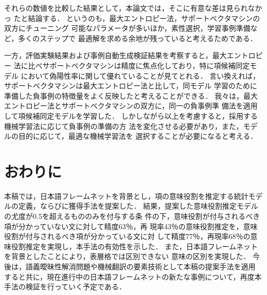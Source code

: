 \documentclass[japanese]{jnlp_1.2b}
\begin{document}
それらの数値を比較した結果として，本論文では，そこに有意な差は見られなかっ
たと結論する．
というのも，最大エントロピー法，サポートベクタマシンの双方にチューニング
可能なパラメータが多いほか，素性選択，学習事例準備など，多くのステップで
最適解を求める余地が残っていると考えるためである．

一方，評価実験結果および事例自動生成検証結果を考察すると，最大エントロピー
法に比べサポートベクタマシンは精度に焦点化しており，特に項候補同定モデル
において偽陽性率に関して優れていることが見てとれる．
言い換えれば，サポートベクタマシンは最大エントロピー法と比して，同モデル
学習のために準備した負事例の特徴量をよく反映したと考えることができる．
我々は，最大エントロピー法とサポートベクタマシンの双方に，同一の負事例準
備法を適用して項候補同定モデルを学習した．
しかしながら以上を考慮すると，採用する機械学習法に応じて負事例の準備の方
法を変化させる必要があり，また，モデルの目的に応じて，最適な機械学習法を
選択することが必要になると考える．



\section{おわりに}\label{sec:conc}

本稿では，日本語フレームネットを背景とし，項の意味役割を推定する統計モデ
ルの定義，ならびに獲得手法を提案した．
結果，提案した意味役割推定モデルの尤度が0.5を超えるもののみを付与する条
件の下，意味役割が付与されるべき項が分かっていない文に対して精度63％，再
現率43％の意味役割推定を，意味役割が付与されるべき項が分かっている文に対
して精度77％，再現率68％の意味役割推定を実現し，本手法の有効性を示した．
また，日本語フレームネットを背景としたことにより，表層格では区別できない
意味の区別を実現した．
今後は，語義曖昧性解消問題や機械翻訳の要素技術として本稿の提案手法を適用
すると共に，現在進行中の日本語フレームネットの新たな事例について，再度本
手法の検証を行っていく予定である．
\end{document}
